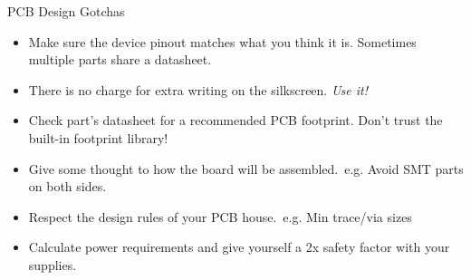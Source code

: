 \documentclass{beamer}
\begin{document}
\begin{frame}{PCB Design Gotchas}
  \begin{itemize}
    \item Make sure the device pinout matches what you think it is. Sometimes multiple parts share a datasheet.
    \item There is no charge for extra writing on the silkscreen. \emph{Use it!}
    \item Check part's datasheet for a recommended PCB footprint. Don't trust the built-in footprint library!
    \item Give some thought to how the board will be assembled.\ e.g. Avoid SMT parts on both sides.
    \item Respect the design rules of your PCB house.\ e.g. Min trace/via sizes
    \item Calculate power requirements and give yourself a 2x safety factor with your supplies.
  \end{itemize}
\end{frame}
\end{document}
